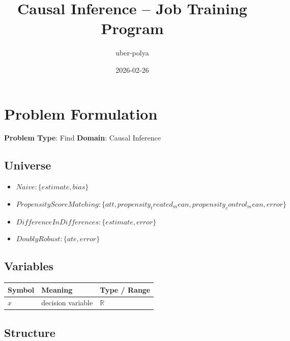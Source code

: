\documentclass[11pt, a4paper]{article}
\title{Causal Inference -- Job Training Program}
\author{uber-polya}
\date{2026-02-26}
\begin{document}
\maketitle
\tableofcontents
\newpage

\section{Problem Formulation}

\begin{polyamodel}

\textbf{Problem Type}: Find \hfill
\textbf{Domain}: Causal Inference


\end{polyamodel}

\subsection{Universe}

\begin{itemize}
  \item $Naive: \{estimate, bias\}$
  \item $Propensity Score Matching: \{att, propensity_treated_mean, propensity_control_mean, error\}$
  \item $Difference In Differences: \{estimate, error\}$
  \item $Doubly Robust: \{ate, error\}$
\end{itemize}

\subsection{Variables}

\begin{longtable}{lll}
\toprule
\textbf{Symbol} & \textbf{Meaning} & \textbf{Type / Range} \\
\midrule
\endhead
$x$ & decision variable & $\mathbb{{R}}$ \\
\bottomrule
\end{longtable}

\subsection{Structure}
\end{document}
